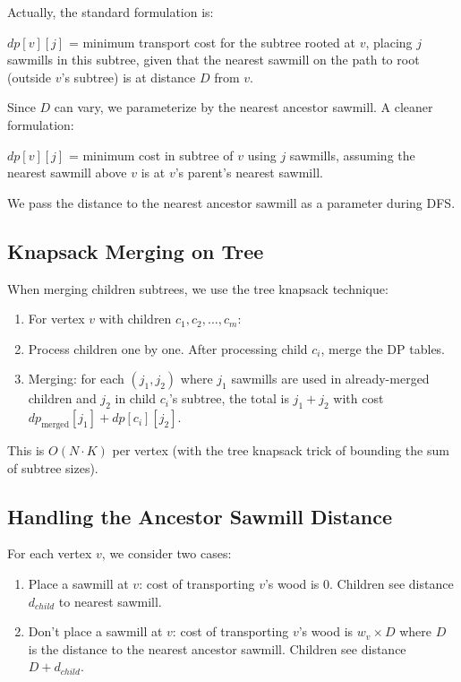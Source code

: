 \documentclass[11pt,a4paper]{article}
\begin{document}
Actually, the standard formulation is:

$dp[v][j]$ = minimum transport cost for the subtree rooted at $v$, placing $j$ sawmills in this subtree, given that the nearest sawmill on the path to root (outside $v$'s subtree) is at distance $D$ from $v$.

Since $D$ can vary, we parameterize by the nearest ancestor sawmill. A cleaner formulation:

$dp[v][j]$ = minimum cost in subtree of $v$ using $j$ sawmills, assuming the nearest sawmill above $v$ is at $v$'s parent's nearest sawmill.

We pass the distance to the nearest ancestor sawmill as a parameter during DFS.

\subsection{Knapsack Merging on Tree}
When merging children subtrees, we use the tree knapsack technique:
\begin{enumerate}
    \item For vertex $v$ with children $c_1, c_2, \ldots, c_m$:
    \item Process children one by one. After processing child $c_i$, merge the DP tables.
    \item Merging: for each $(j_1, j_2)$ where $j_1$ sawmills are used in already-merged children and $j_2$ in child $c_i$'s subtree, the total is $j_1 + j_2$ with cost $dp_{\text{merged}}[j_1] + dp[c_i][j_2]$.
\end{enumerate}

This is $O(N \cdot K)$ per vertex (with the tree knapsack trick of bounding the sum of subtree sizes).

\subsection{Handling the Ancestor Sawmill Distance}
For each vertex $v$, we consider two cases:
\begin{enumerate}
    \item Place a sawmill at $v$: cost of transporting $v$'s wood is $0$. Children see distance $d_{child}$ to nearest sawmill.
    \item Don't place a sawmill at $v$: cost of transporting $v$'s wood is $w_v \times D$ where $D$ is the distance to the nearest ancestor sawmill. Children see distance $D + d_{child}$.
\end{enumerate}
\end{document}
